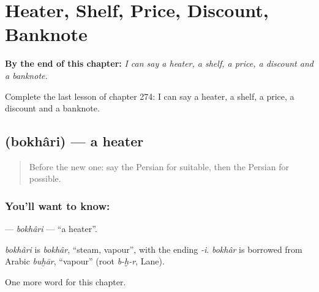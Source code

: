 
\chapter{Heater, Shelf, Price, Discount, Banknote}
\label{ch:fa-heater-shelf-price-discount-banknote}

\begin{chapteropening}
\textbf{By the end of this chapter:} \emph{I can say a heater, a shelf, a price, a discount and a banknote.}

Complete the last lesson of chapter 274: I can say a heater, a shelf, a price, a discount and a banknote.
\end{chapteropening}

\section[\texorpdfstring{\fa{بخاری} (bokhâri)}{بخاری (bokhâri)}]{ (bokhâri) — a heater}

\label{lesson:FA-C274-bokhari}



\begin{quote}
Before the new one: say the Persian for suitable, then the Persian for possible.
\end{quote}

\subsection*{You'll want to know: }
\textbf{} — \emph{bokhâri} — \textquotedblleft{}a heater\textquotedblright{}.

\begin{cousinweb}
\emph{bokhâri} is \emph{bokhâr}, \textquotedblleft{}steam, vapour\textquotedblright{}, with the ending \emph{-i}. \emph{bokhâr} is borrowed from Arabic \emph{buḫār}, \textquotedblleft{}vapour\textquotedblright{} (root \emph{b-ḫ-r}, Lane).
\end{cousinweb}

\begin{grammarlens}[title={What you've built}]
One more word for this chapter.
\end{grammarlens}

